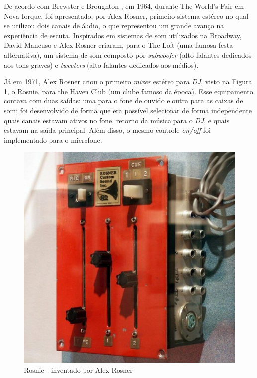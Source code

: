 \par
De acordo com  Brewster e Broughton \cite{lastnight}, em 1964, durante The World's Fair em Nova Iorque, foi apresentado, por Alex Rosner, primeiro sistema estéreo no qual se utilizou dois canais de áudio, o que representou um grande avanço na experiência de escuta. Inspirados em sistemas de som utilizados na Broadway, David Mancuso e Alex Rosner criaram, para o The Loft (uma famosa festa alternativa), um sistema de som composto por \textit{subwoofer} (alto-falantes dedicados aos tons graves) e \textit{tweeters} (alto-falantes dedicados aos médios).
\par
Já em 1971, Alex Rosner criou o primeiro \textit{mixer} estéreo para \textit{DJ}, visto na Figura \ref{fig08}, o Rosnie, para the Haven Club (um clube famoso da época). Esse equipamento contava com duas saídas: uma para o fone de ouvido e outra para as caixas de som; foi desenvolvido de forma que era possível selecionar de forma independente quais canais estavam ativos no fone, retorno da música para o \textit{DJ}, e quais estavam na saída principal. Além disso, o mesmo controle \textit{on/off} foi implementado para o microfone. 
\begin{figure}[h]
	\centering
    \includegraphics[scale=0.4]{figuras/fig08.eps}
	\caption{Rosnie - inventado por Alex Rosner}
	\label{fig08}
\end{figure}
